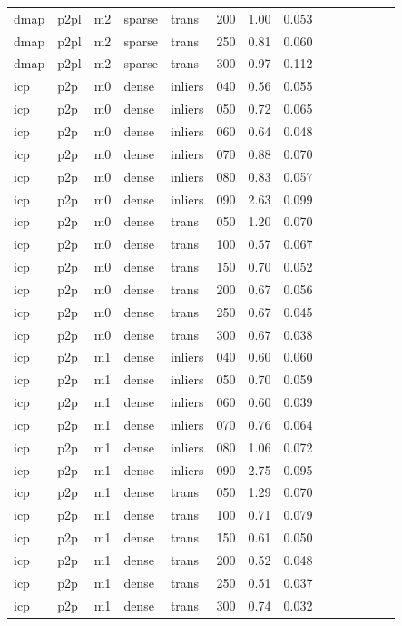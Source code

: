 \begin{table}[htbp]
\begin{tabular}{llllllrrrrrrrr}
  dmap & p2pl & m2 & sparse & trans & 200 & 1.00 & 0.053 \\
  dmap & p2pl & m2 & sparse & trans & 250 & 0.81 & 0.060 \\
  dmap & p2pl & m2 & sparse & trans & 300 & 0.97 & 0.112 \\
  icp & p2p & m0 & dense & inliers & 040 & 0.56 & 0.055 \\
  icp & p2p & m0 & dense & inliers & 050 & 0.72 & 0.065 \\
  icp & p2p & m0 & dense & inliers & 060 & 0.64 & 0.048 \\
  icp & p2p & m0 & dense & inliers & 070 & 0.88 & 0.070 \\
  icp & p2p & m0 & dense & inliers & 080 & 0.83 & 0.057 \\
  icp & p2p & m0 & dense & inliers & 090 & 2.63 & 0.099 \\
  icp & p2p & m0 & dense & trans & 050 & 1.20 & 0.070 \\
  icp & p2p & m0 & dense & trans & 100 & 0.57 & 0.067 \\
  icp & p2p & m0 & dense & trans & 150 & 0.70 & 0.052 \\
  icp & p2p & m0 & dense & trans & 200 & 0.67 & 0.056 \\
  icp & p2p & m0 & dense & trans & 250 & 0.67 & 0.045 \\
  icp & p2p & m0 & dense & trans & 300 & 0.67 & 0.038 \\
  icp & p2p & m1 & dense & inliers & 040 & 0.60 & 0.060 \\
  icp & p2p & m1 & dense & inliers & 050 & 0.70 & 0.059 \\
  icp & p2p & m1 & dense & inliers & 060 & 0.60 & 0.039 \\
  icp & p2p & m1 & dense & inliers & 070 & 0.76 & 0.064 \\
  icp & p2p & m1 & dense & inliers & 080 & 1.06 & 0.072 \\
  icp & p2p & m1 & dense & inliers & 090 & 2.75 & 0.095 \\
  icp & p2p & m1 & dense & trans & 050 & 1.29 & 0.070 \\
  icp & p2p & m1 & dense & trans & 100 & 0.71 & 0.079 \\
  icp & p2p & m1 & dense & trans & 150 & 0.61 & 0.050 \\
  icp & p2p & m1 & dense & trans & 200 & 0.52 & 0.048 \\
  icp & p2p & m1 & dense & trans & 250 & 0.51 & 0.037 \\
  icp & p2p & m1 & dense & trans & 300 & 0.74 & 0.032 \\

\end{tabular}
\end{table}

